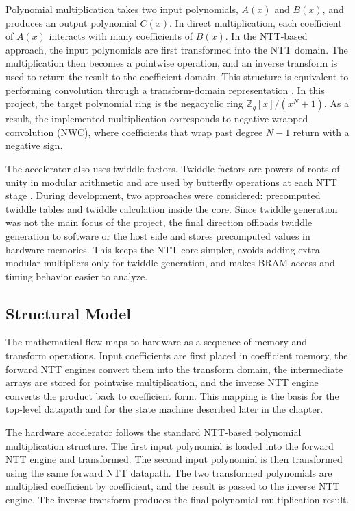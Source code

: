 \documentclass[a4paper, 12pt, titlepage]{article}
\begin{document}
Polynomial multiplication takes two input polynomials, $A(x)$ and $B(x)$, and
produces an output polynomial $C(x)$. In direct multiplication, each coefficient
of $A(x)$ interacts with many coefficients of $B(x)$. In the NTT-based approach,
the input polynomials are first transformed into the NTT domain. The
multiplication then becomes a pointwise operation, and an inverse transform is
used to return the result to the coefficient domain. This structure is equivalent
to performing convolution through a transform-domain representation
\cite{guide-ntt}. In this project, the target polynomial ring is
the negacyclic ring \(\mathbb{Z}_q[x]/(x^N+1)\). As a result, the implemented
multiplication corresponds to negative-wrapped convolution (NWC), where
coefficients that wrap past degree \(N-1\) return with a negative sign.

The accelerator also uses twiddle factors. Twiddle factors are powers of roots of
unity in modular arithmetic and are used by butterfly operations at each NTT
stage \cite{guide-ntt}. During development, two approaches were considered:
precomputed twiddle tables and twiddle calculation inside the core. Since
twiddle generation was not the main focus of the project, the final direction
offloads twiddle generation to software or the host side and stores precomputed
values in hardware memories. This keeps the NTT core simpler, avoids adding
extra modular multipliers only for twiddle generation, and makes BRAM access and
timing behavior easier to analyze.

\subsection{Structural Model}

The mathematical flow maps to hardware as a sequence of memory and transform
operations. Input coefficients are first placed in coefficient memory, the
forward NTT engines convert them into the transform domain, the intermediate
arrays are stored for pointwise multiplication, and the inverse NTT engine
converts the product back to coefficient form. This mapping is the basis for the
top-level datapath and for the state machine described later in the chapter.

The hardware accelerator follows the standard NTT-based polynomial
multiplication structure. The first input polynomial is loaded into the forward
NTT engine and transformed. The second input polynomial is then transformed using
the same forward NTT datapath. The two transformed polynomials are multiplied
coefficient by coefficient, and the result is passed to the inverse NTT engine.
The inverse transform produces the final polynomial multiplication result.
\end{document}
